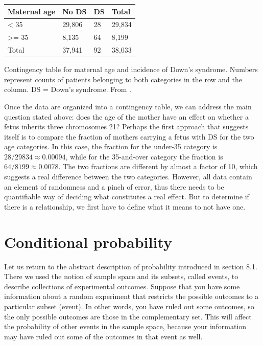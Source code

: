 \documentclass[
  letterpaper,
  DIV=11,
  numbers=noendperiod]{scrreprt}
\begin{document}
\begin{longtable}[]{@{}llll@{}}
\toprule()
Maternal age & No DS & DS & Total \\
\midrule()
\endhead
\textless{} 35 & 29,806 & 28 & 29,834 \\
\textgreater= 35 & 8,135 & 64 & 8,199 \\
Total & 37,941 & 92 & 38,033 \\
\bottomrule()
\end{longtable}

Contingency table for maternal age and incidence of Down's syndrome.
Numbers represent counts of patients belonging to both categories in the
row and the column. DS = Down's syndrome. From
\cite{malone_first-trimester_2005}.

Once the data are organized into a contingency table, we can address the
main question stated above: does the age of the mother have an effect on
whether a fetus inherits three chromosomes 21? Perhaps the first
approach that suggests itself is to compare the fraction of mothers
carrying a fetus with DS for the two age categories. In this case, the
fraction for the under-35 category is \(28/29834 \approx 0.00094\),
while for the 35-and-over category the fraction is
\(64/8199 \approx 0.0078\). The two fractions are different by almost a
factor of 10, which suggests a real difference between the two
categories. However, all data contain an element of randomness and a
pinch of error, thus there needs to be quantifiable way of deciding what
constitutes a real effect. But to determine if there is a relationship,
we first have to define what it means to not have one.

\hypertarget{conditional-probability}{%
\section{Conditional probability}\label{conditional-probability}}

\label{sec:math6_1}

Let us return to the abstract description of probability introduced in
section 8.1. There we used the notion of sample space and its subsets,
called events, to describe collections of experimental outcomes. Suppose
that you have some information about a random experiment that restricts
the possible outcomes to a particular subset (event). In other words,
you have ruled out some outcomes, so the only possible outcomes are
those in the complementary set. This will affect the probability of
other events in the sample space, because your information may have
ruled out some of the outcomes in that event as well.
\end{document}
